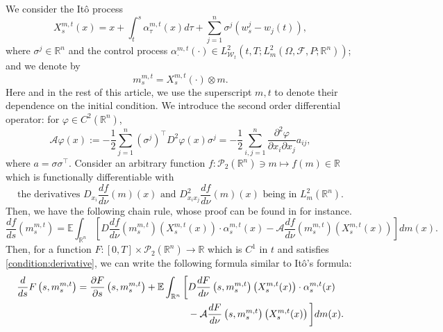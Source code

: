 \documentclass[11pt]{article}
\numberwithin{equation}{section}
\newcommand{\e}{\mathbb{E}}
\newcommand{\br}{\mathbb{R}}
\newcommand{\pr}{\mathcal{P}}
\newcommand{\brn}{{\mathbb{R}^n}}
\newcommand{\1}{\mbox{1\hspace{-1mm}I}}
\begin{document}
We consider the It\^o process 
\begin{equation}
    X^{m,t}_s(x)=x+\int_{t}^{s}\alpha^{m,t}_\tau(x)d\tau+\sum_{j=1}^{n}\sigma^{j}\left(w^{j}_s-w_{j}(t)\right), \label{eq:2-50}
\end{equation}
where $\sigma^{j}\in \brn$ and the control process $\alpha^{m,t}_\cdot(\cdot)\in L_{\mathcal{W}_{t}}^{2}\left(t,T;L_{m}^{2}(\Omega,\mathcal{F},P;\brn)\right)$; and we denote by 
\begin{equation}
m^{m,t}_s=X^{m,t}_s(\cdot)\otimes m. \label{eq:2-52}
\end{equation}
Here and in the rest of this article, we use the superscript $m,t$ to denote their dependence on the initial condition. We introduce the second order differential operator: for $\varphi\in C^2(\brn)$, 
\begin{equation}
    \mathcal{A}\varphi(x):=-\dfrac{1}{2}\sum_{j=1}^{n}\left(\sigma^{j}\right)^\top D^{2}\varphi(x)\sigma^{j}=-\dfrac{1}{2}\sum_{i,j=1}^{n}\dfrac{\partial^{2}\varphi}{\partial x_{i}\partial x_{j}}a_{ij},
\end{equation}
where $a=\sigma\sigma^\top$. Consider an arbitrary 
 function $f:\pr_2(\brn) \ni m\mapsto f(m)\in\br$ which is functionally differentiable with 
\begin{equation}\label{condition:derivative}
    \text{the derivatives $D_{x_{i}}\dfrac{df}{d\nu}(m)(x)$ and $D_{x_{i}x_{j}}^{2}\dfrac{df}{d\nu}(m)(x)$ being in $L_{m}^{2}(\brn)$.}
\end{equation}
Then, we have the following chain rule, whose proof can be found in \cite{AB5} for instance. 
\begin{equation}
    \dfrac{df}{ds}\left(m^{m,t}_s\right)=\e\int_{\brn}\left[D\dfrac{df}{d\nu}\left(m^{m,t}_s\right)\left(X^{m,t}_s(x)\right)\cdot\alpha^{m,t}_s(x)-\mathcal{A}\dfrac{df}{d\nu}\left(m^{m,t}_s\right)\left(X^{m,t}_s(x)\right)\right]dm(x). \label{eq:2-54}
\end{equation}
Then, for a function $F:[0,T]\times \pr_2(\brn)\to \br$ which is $C^1$ in $t$ and satisfies \eqref{condition:derivative}, we can write the following formula similar to It\^o's formula: 
\begin{align}
    \dfrac{d}{ds}F\left(s,m^{m,t}_s\right)=\dfrac{\partial F}{\partial s}\left(s,m^{m,t}_s\right)+\e\int_{\brn}\bigg[&D\dfrac{dF}{d\nu}\left(s, m^{m,t}_s \right)\left(X^{m,t}_s(x)\right) \cdot \alpha^{m,t}_s(x) \notag \\
    &-\mathcal{A}\dfrac{dF}{d\nu}\left(s,m^{m,t}_s\right)\left(X^{m,t}_s(x)\right) \bigg] dm(x). \label{eq:2-560}
\end{align}
\end{document}
